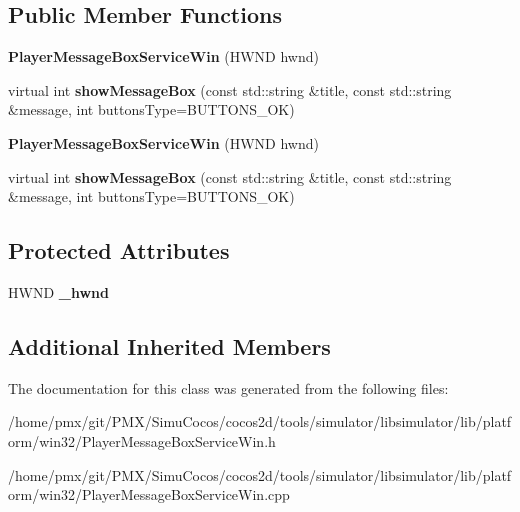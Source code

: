 \subsection*{Public Member Functions}
\begin{DoxyCompactItemize}
\item 
\mbox{\label{classPlayerMessageBoxServiceWin_a52a87723df60828b127e08c26e7876da}} 
{\bfseries Player\+Message\+Box\+Service\+Win} (H\+W\+ND hwnd)
\item 
\mbox{\label{classPlayerMessageBoxServiceWin_aa95744e01e771cf8446f404a69c0d079}} 
virtual int {\bfseries show\+Message\+Box} (const std\+::string \&title, const std\+::string \&message, int buttons\+Type=B\+U\+T\+T\+O\+N\+S\+\_\+\+OK)
\item 
\mbox{\label{classPlayerMessageBoxServiceWin_abca21c1ccbb39fe2b2086069e8330e96}} 
{\bfseries Player\+Message\+Box\+Service\+Win} (H\+W\+ND hwnd)
\item 
\mbox{\label{classPlayerMessageBoxServiceWin_a88d91f3b166391030dcc197d9eabc48e}} 
virtual int {\bfseries show\+Message\+Box} (const std\+::string \&title, const std\+::string \&message, int buttons\+Type=B\+U\+T\+T\+O\+N\+S\+\_\+\+OK)
\end{DoxyCompactItemize}
\subsection*{Protected Attributes}
\begin{DoxyCompactItemize}
\item 
\mbox{\label{classPlayerMessageBoxServiceWin_a20d19889b258b0be9c843781f3d18747}} 
H\+W\+ND {\bfseries \+\_\+hwnd}
\end{DoxyCompactItemize}
\subsection*{Additional Inherited Members}


The documentation for this class was generated from the following files\+:\begin{DoxyCompactItemize}
\item 
/home/pmx/git/\+P\+M\+X/\+Simu\+Cocos/cocos2d/tools/simulator/libsimulator/lib/platform/win32/Player\+Message\+Box\+Service\+Win.\+h\item 
/home/pmx/git/\+P\+M\+X/\+Simu\+Cocos/cocos2d/tools/simulator/libsimulator/lib/platform/win32/Player\+Message\+Box\+Service\+Win.\+cpp\end{DoxyCompactItemize}
